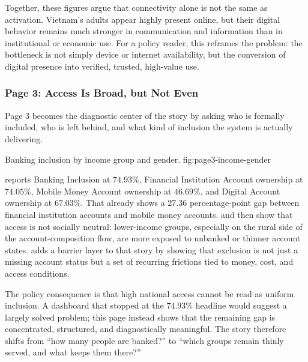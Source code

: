 \documentclass[../main.tex]{subfiles}
\begin{document}
Together, these figures argue that connectivity alone is not the same as
activation. Vietnam's adults appear highly present online, but their digital
behavior remains much stronger in communication and information than in
institutional or economic use. For a policy reader, this reframes the problem:
the bottleneck is not simply device or internet availability, but the
conversion of digital presence into verified, trusted, high-value use.

\subsubsection{Page 3: Access Is Broad, but Not Even}
\label{subsubsec:page3-access}

Page 3 becomes the diagnostic center of the story by asking who is formally
included, who is left behind, and what kind of inclusion the system is actually
delivering.

{Banking inclusion by income group and gender.}
{fig:page3-income-gender}

 reports Banking Inclusion at
\(74.93\%\), Financial Institution Account ownership at \(74.05\%\), Mobile
Money Account ownership at \(46.69\%\), and Digital Account ownership at
\(67.03\%\). That already shows a 27.36 percentage-point gap between financial
institution accounts and mobile money accounts. 
and  then show
that access is not socially neutral: lower-income groups, especially on the
rural side of the account-composition flow, are more exposed to unbanked or
thinner account states. 
adds a barrier layer to that story by showing that exclusion is not just a
missing account status but a set of recurring frictions tied to money, cost,
and access conditions.


The policy consequence is that high national access cannot be read as uniform
inclusion. A dashboard that stopped at the \(74.93\%\) headline would suggest a
largely solved problem; this page instead shows that the remaining gap is
concentrated, structured, and diagnostically meaningful. The story therefore
shifts from ``how many people are banked?'' to ``which groups remain thinly
served, and what keeps them there?''
\end{document}
